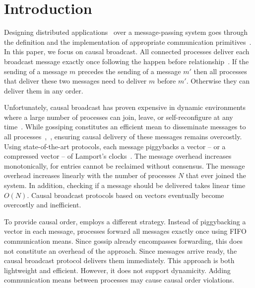 
\section{Introduction}

Designing distributed
applications~\cite{demers1987epidemic,nakamoto2009bitcoin,nedelec2016crate,shapiro2011comprehensive}
over a message-passing system goes through the definition and the implementation
of appropriate communication primitives~\cite{hadzilacos1994modular}.  In this
paper, we focus on causal broadcast.
All connected processes deliver each broadcast message exactly once following
the happen before relationship~\cite{lamport1978time,schwarz1994detecting}. If
the sending of a message $m$ precedes the sending of a message $m'$ then all
processes that deliver these two messages need to deliver $m$ before
$m'$. Otherwise they can deliver them in any order.

Unfortunately, causal broadcast has proven expensive in dynamic environments
where a large number of processes can join, leave, or self-reconfigure at any
time~\cite{charronbost1991concerning}. While gossiping constitutes an efficient
mean to disseminate messages to all
processes~\cite{demers1987epidemic},~\cite{birman1999bimodal}, ensuring causal
delivery of these messages remains overcostly.  Using state-of-the-art
protocols, each message piggybacks a vector -- or a compressed vector -- of
Lamport's
clocks~\cite{almeida2008interval,fidge1988timestamps,mattern1989virtual,singhal1992efficient}.
The message overhead increases monotonically, for entries cannot be reclaimed
without consensus. The message overhead increases linearly with the number of
processes $N$ that ever joined the system.  In addition, checking if a message
should be delivered takes linear time $O(N)$. Causal broadcast protocols based
on vectors eventually become overcostly and inefficient.


To provide causal order, \cite{friedman2004causal} employs a different
strategy. Instead of piggybacking a vector in each message, processes forward
all messages exactly once using FIFO communication means. Since gossip already
encompasses forwarding, this does not constitute an overhead of the
approach. Since messages arrive ready, the causal broadcast protocol delivers
them immediately. This approach is both lightweight and efficient. However, it
does not support dynamicity. Adding communication means between processes may
cause causal order violations.


